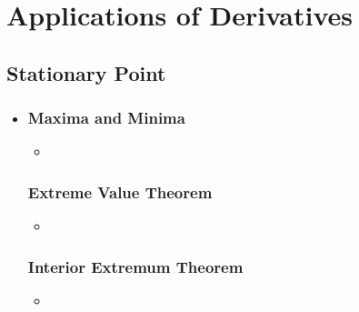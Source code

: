 \chapter{Applications of Derivatives}

\section{Stationary Point}
\begin{itemize}
  \item []

  \subsection{Maxima and Minima}
  \begin{itemize}
    \item
  \end{itemize}

  \subsection{Extreme Value Theorem}
  \begin{itemize}
    \item
  \end{itemize}

  \subsection{Interior Extremum Theorem}
  \begin{itemize}
    \item
  \end{itemize}


\end{itemize}

